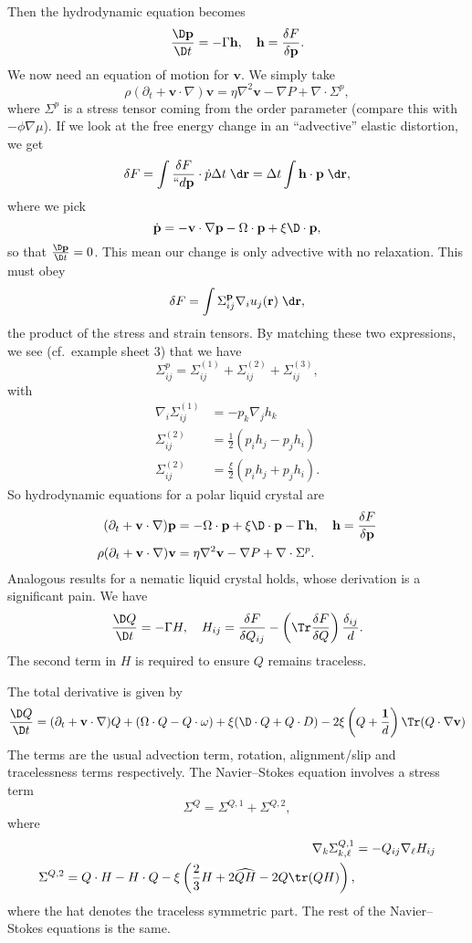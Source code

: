 \documentclass[a4paper]{article}
\begin{document}
Then the hydrodynamic equation becomes
\[
  \frac{\D \mathbf{p}}{\D t} = - \Gamma \mathbf{h},\quad \mathbf{h} = \frac{\delta F}{\delta \mathbf{p}}.
\]
We now need an equation of motion for $\mathbf{v}$. We simply take
\[
  \rho(\partial_t +\mathbf{v} \cdot \nabla) \mathbf{v} = \eta \nabla^2 \mathbf{v} - \nabla P + \nabla \cdot \Sigma^p,
\]
where $\Sigma^p$ is a stress tensor coming from the order parameter (compare this with $- \phi \nabla \mu$). If we look at the free energy change in an ``advective'' elastic distortion, we get
\[
  \delta F = \int \frac{\delta F}{``d \mathbf{p}} \cdot \dot{p} \Delta t \;\d \mathbf{r} = \Delta t \int \mathbf{h} \cdot \mathbf{p} \;\d \mathbf{r},
\]
where we pick
\[
  \dot{\mathbf{p}} = - \mathbf{v} \cdot \nabla \mathbf{p} - \Omega \cdot \mathbf{p} + \xi \D \cdot \mathbf{p},
\]
so that $\frac{\D \mathbf{p}}{\D t} = 0$. This mean our change is only advective with no relaxation. This must obey
\[
  \delta F = \int \Sigma_{ij}^{\mathbf{p}} \nabla_i u_j(\mathbf{r}) \;\d \mathbf{r},
\]
the product of the stress and strain tensors. By matching these two expressions, we see (cf.\ example sheet 3) that we have
\[
  \Sigma_{ij}^p = \Sigma_{ij}^{(1)} + \Sigma_{ij}^{(2)} + \Sigma_{ij}^{(3)},
\]
with
\begin{align*}
  \nabla_i \Sigma_{ij}^{(1)} &= - p_k \nabla_j h_k\\
  \Sigma_{ij}^{(2)} &= \frac{1}{2} (p_i h_j - p_j h_i)\\
  \Sigma_{ij}^{(2)} &= \frac{\xi}{2} (p_i h_j + p_j h_i).
\end{align*}
So hydrodynamic equations for a polar liquid crystal are
\begin{align*}
  (\partial_t + \mathbf{v} \cdot \nabla)\mathbf{p} &= - \Omega \cdot \mathbf{p} + \xi \D \cdot \mathbf{p} - \Gamma \mathbf{h},\quad \mathbf{h} = \frac{\delta F}{\delta \mathbf{p}}\\
  \rho (\partial_t + \mathbf{v} \cdot \nabla)\mathbf{v} &= \eta \nabla^2 \mathbf{v} - \nabla P + \nabla \cdot \Sigma^p.
\end{align*}
Analogous results for a nematic liquid crystal holds, whose derivation is a significant pain. We have
\[
  \frac{\D Q}{\D t} = - \Gamma H,\quad H_{ij} = \frac{\delta F}{\delta Q_{ij}} - \left( \Tr\frac{\delta F}{\delta Q}\right) \frac{\delta_{ij}}{d}.
\]
The second term in $H$ is required to ensure $Q$ remains traceless.

The total derivative is given by
\[
  \frac{\D Q}{\D t} = (\partial_t + \mathbf{v} \cdot \nabla) Q + (\Omega \cdot Q - Q \cdot \omega) + \xi (\D \cdot Q + Q \cdot D) - 2\xi \left(Q + \frac{\mathbf{1}}{d}\right) \Tr(Q \cdot \nabla \mathbf{v})
\]
The terms are the usual advection term, rotation, alignment/slip and tracelessness terms respectively. The Navier--Stokes equation involves a stress term
\[
  \Sigma^Q = \Sigma^{Q, 1} + \Sigma^{Q, 2},
\]
where
\begin{align*}
  \nabla_k \Sigma^{Q,  1}_{k, \ell} &= - Q_{ij} \nabla_\ell H_{ij}\\
  \Sigma^{Q, 2} = Q \cdot H - H \cdot Q - \xi \left(\frac{2}{3} H + 2 \widehat{QH} - 2 Q \tr (Q H)\right),
\end{align*}
where the hat denotes the traceless symmetric part. The rest of the Navier--Stokes equations is the same.
\end{document}
